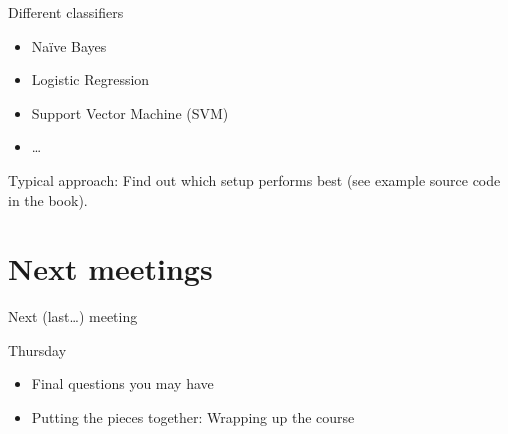\documentclass{beamer}
\begin{document}
\begin{frame}{Different classifiers}
	\begin{itemize}
		\item Naïve Bayes
		\item Logistic Regression
		\item Support Vector Machine (SVM)
		\item \ldots
	\end{itemize}
Typical approach: Find out which setup performs best (see example source code in the book).
\end{frame}





\section{Next meetings}
\begin{frame}{Next (last\ldots) meeting}

\begin{block}{Thursday}
  \begin{itemize}
  \item Final questions you may have
  \item Putting the pieces together: Wrapping up the course
  \end{itemize}
\end{block}


\end{frame}
\end{document}
